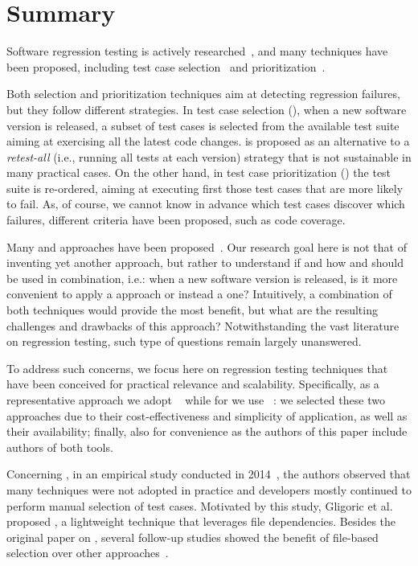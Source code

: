 \section{Summary}\label{sec:orch_summary}

Software regression testing is actively researched~\cite{rosero_15_2016,bin_ali_search_2019,YooHarman10RegressionTestingSurvey}, and many techniques have been proposed, including test case selection~\cite{kazmi_effective_2017} and prioritization~\cite{khatibsyarbini_test_2018}.

Both selection and prioritization techniques aim at detecting regression failures, but they follow different strategies. 
In test case selection (\tcs), when a new software version is released, a subset of test cases is selected from the available test suite aiming at exercising all the latest code changes. 
\tcs is proposed as an alternative to a \textit{retest-all} (i.e., running all tests at each version) strategy that is not sustainable in many practical cases.
On the other hand, in test case prioritization (\tcp) the test suite is re-ordered, aiming at executing first those test cases that are more likely to fail. As, of course, we cannot know in advance which test cases discover which failures, different \tcp criteria have been proposed, such as code coverage. 
 
Many \tcs and \tcp approaches have been proposed~\cite{soetens2016change,legunsen2016,henard2016,luo2018static}.
Our research goal here is not that of inventing yet another approach, but rather to understand if and how \tcs and \tcp  should be used in combination, i.e.:
when a new software version is released, is it more convenient to apply a \tcs approach or instead a \tcp one?
Intuitively, a combination of both techniques would provide the most benefit, but what are the resulting challenges and drawbacks of this approach?
Notwithstanding the vast literature on  regression testing, 
such type of questions remain largely unanswered.

To address such concerns, 
we focus here on regression testing techniques that have been conceived for practical relevance and scalability. 
Specifically, as a representative \tcs approach we adopt \ek~\cite{gligoricEk}  while for \tcp we use \fs~\cite{miranda_fast}: we selected these two approaches due to their cost-effectiveness and simplicity of application, as well as their availability; finally, also for convenience as the authors of this paper include authors of both tools.

Concerning \tcs, in an empirical study conducted in 2014~\cite{gligoric_empirical}, the authors observed that many techniques were not adopted in practice and developers mostly continued to perform manual selection of test cases.  
Motivated by this study, Gligoric et al.~\cite{gligoricEk} proposed  \ek,  a lightweight \tcs technique that leverages file dependencies.
Besides the original paper on \ek, several follow-up studies showed the benefit of file-based selection over other approaches~\cite{legunsen2016, Zhang18HybridRTS}.

